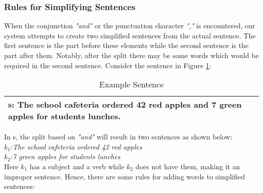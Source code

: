 \documentclass[11pt]{article}
\begin{document}
\subsubsection{Rules for Simplifying Sentences}\label{sec:SimplificationRules}
When the conjunction \textit{"and"} or  the punctuation character \textit{","} is encountered, our system attempts to create two simplified sentences from the actual sentence. The first sentence is the part before these elements while the second sentence is the part after them. Notably, after the split there may be some words which would be required in the second sentence. Consider the sentence in Figure \ref{figure:2}:
\vspace{-0.7cm}
\begin{table}[H]
\centering
\begin{tabular}{ | m{7cm} | }
\hline
$\mathbf{s}$: \small The school cafeteria ordered 42 red apples and 7 green apples for students lunches.\\
\hline
\end{tabular}
\caption{\small Example Sentence}
\label{figure:2}
\end{table}
\vspace{0.3cm}
In s, the split based on \textit{"and"} will result in two sentences as shown below:
\\
$\mathit{k_{1}}$:\textit{The school cafeteria ordered 42 red apples}\\
$\mathit{k_{2}}$:\textit{7 green apples for students lunches}
\\
Here $\mathit{k_{1}}$ has a subject and a verb while $\mathit{k_{2}}$ does not have them, making it an improper sentence. Hence, there are some rules for adding words to simplified sentences:
\end{document}
